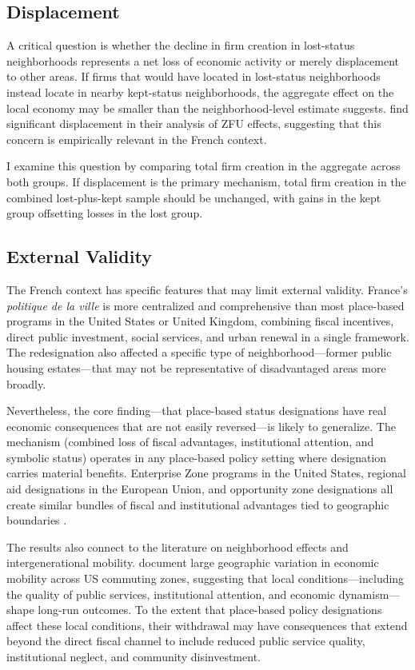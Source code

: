 \documentclass[12pt]{article}
\begin{document}
\subsection{Displacement}

A critical question is whether the decline in firm creation in lost-status neighborhoods represents a net loss of economic activity or merely displacement to other areas. If firms that would have located in lost-status neighborhoods instead locate in nearby kept-status neighborhoods, the aggregate effect on the local economy may be smaller than the neighborhood-level estimate suggests. \citet{mayer2017effects} find significant displacement in their analysis of ZFU effects, suggesting that this concern is empirically relevant in the French context.

I examine this question by comparing total firm creation in the aggregate across both groups. If displacement is the primary mechanism, total firm creation in the combined lost-plus-kept sample should be unchanged, with gains in the kept group offsetting losses in the lost group.

\subsection{External Validity}

The French context has specific features that may limit external validity. France's \textit{politique de la ville} is more centralized and comprehensive than most place-based programs in the United States or United Kingdom, combining fiscal incentives, direct public investment, social services, and urban renewal in a single framework. The redesignation also affected a specific type of neighborhood---former public housing estates---that may not be representative of disadvantaged areas more broadly.

Nevertheless, the core finding---that place-based status designations have real economic consequences that are not easily reversed---is likely to generalize. The mechanism (combined loss of fiscal advantages, institutional attention, and symbolic status) operates in any place-based policy setting where designation carries material benefits. Enterprise Zone programs in the United States, regional aid designations in the European Union, and opportunity zone designations all create similar bundles of fiscal and institutional advantages tied to geographic boundaries \citep{bartik2020using, slattery2020evaluating}.

The results also connect to the literature on neighborhood effects and intergenerational mobility. \citet{chetty2014where} document large geographic variation in economic mobility across US commuting zones, suggesting that local conditions---including the quality of public services, institutional attention, and economic dynamism---shape long-run outcomes. To the extent that place-based policy designations affect these local conditions, their withdrawal may have consequences that extend beyond the direct fiscal channel to include reduced public service quality, institutional neglect, and community disinvestment.
\end{document}

